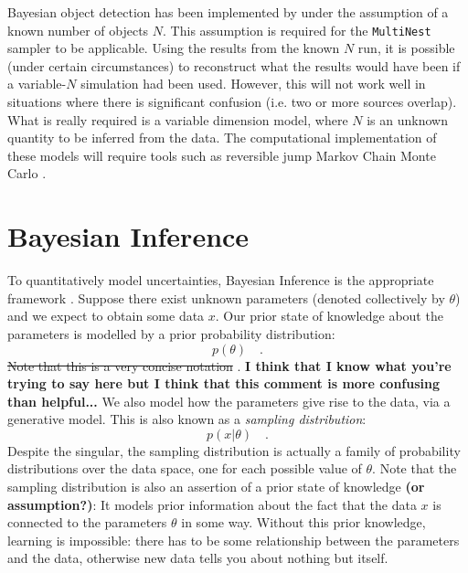 \documentclass[letterpaper, 11pt]{article}
\begin{document}
Bayesian object detection has been implemented by \citet{2011MNRAS.415.3462F}
under the assumption of a known number of objects $N$.
This assumption is required for the
{\tt MultiNest} sampler \citep{multinest} to be applicable.
Using the results from the known $N$
run, it is possible (under certain circumstances) to reconstruct what the
results would have been if a variable-$N$ simulation had been used. However,
this will not work well in situations where there is significant confusion
(i.e. two or more sources overlap). What is really required is a variable
dimension model, where $N$ is an unknown quantity to be inferred from the data.
The computational implementation of these models will require tools such as
reversible jump Markov Chain Monte Carlo \citep{rjmcmc}.

\section{Bayesian Inference}
To quantitatively model uncertainties, Bayesian Inference is the appropriate
framework \citep{cox, jaynes, caticha}. Suppose there exist unknown parameters
(denoted
collectively by $\theta$) and we expect to obtain some data $x$. Our prior
state of knowledge about the parameters is modelled by a prior
probability distribution:
\begin{equation}
p(\theta) \quad.
\end{equation}
\sout{Note that this is a very concise notation} \citep{hogg}.
{\bf I think that I know what you're trying to say here but I think that this
comment is more confusing than helpful...}
We also model how the parameters give rise to the data, via a generative model.
This is also known as a {\it sampling distribution}:
\begin{equation}
p(x|\theta) \quad.
\end{equation}
Despite the singular, the sampling distribution is actually a family of
probability distributions over the data space, one for each possible value
of $\theta$. Note that
the sampling distribution is also an assertion of a prior state of knowledge
{\bf (or assumption?)}:
It models prior information about the fact that the data $x$ is connected to
the parameters $\theta$ in some way. Without this prior knowledge, learning is
impossible: there has to be some relationship between the parameters and the
data, otherwise new data tells you about nothing but itself.
\end{document}
